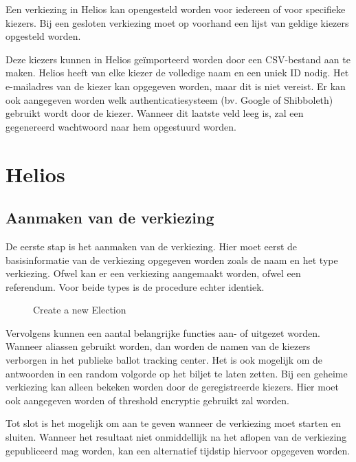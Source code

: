 Een verkiezing in Helios kan opengesteld worden voor iedereen of voor specifieke kiezers. Bij een gesloten verkiezing moet op voorhand een lijst van geldige kiezers opgesteld worden.

\npar Deze kiezers kunnen in Helios ge\"importeerd worden door een CSV-bestand aan te maken. Helios heeft van elke kiezer de volledige naam en een uniek ID nodig. Het e-mailadres van de kiezer kan opgegeven worden, maar dit is niet vereist. Er kan ook aangegeven worden welk authenticatiesysteem (bv. Google of Shibboleth) gebruikt wordt door de kiezer. Wanneer dit laatste veld leeg is, zal een gegenereerd wachtwoord naar hem opgestuurd worden.

\section{Helios}
\label{sec:proc:helios}

\subsection{Aanmaken van de verkiezing}

De eerste stap is het aanmaken van de verkiezing. Hier moet eerst de basisinformatie van de verkiezing opgegeven worden zoals de naam en het type verkiezing. Ofwel kan er een verkiezing aangemaakt worden, ofwel een referendum. Voor beide types is de procedure echter identiek.

\begin{figure}
  \caption{Create a new Election}
  \label{fig:proc:elections_new}
\end{figure}


\npar Vervolgens kunnen een aantal belangrijke functies aan- of uitgezet worden. Wanneer aliassen gebruikt worden, dan worden de namen van de kiezers verborgen in het publieke ballot tracking center. Het is ook mogelijk om de antwoorden in een random volgorde op het biljet te laten zetten. Bij een geheime verkiezing kan alleen bekeken worden door de geregistreerde kiezers. Hier moet ook aangegeven worden of threshold encryptie gebruikt zal worden.

\npar Tot slot is het mogelijk om aan te geven wanneer de verkiezing moet starten en sluiten. Wanneer het resultaat niet onmiddellijk na het aflopen van de verkiezing gepubliceerd mag worden, kan een alternatief tijdstip hiervoor opgegeven worden.

